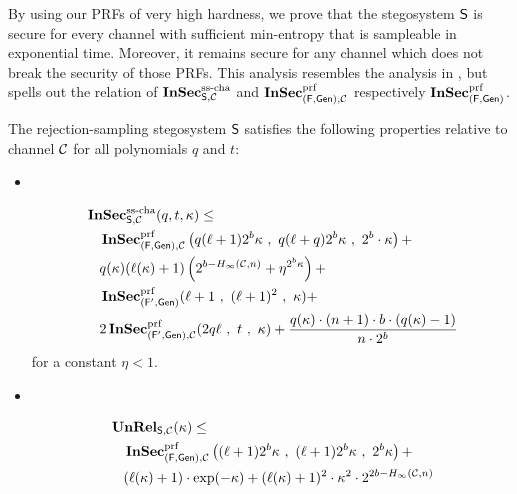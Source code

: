 By using our \acp{PRF} of very high hardness, we prove that the stegosystem  $\operatorname{\mathsf{S}}$
is secure for every channel with
sufficient min-entropy that is sampleable in exponential time. 
Moreover, it remains secure for any channel which does not break 
the security of those \acp{PRF}.
This analysis resembles the analysis in
\cite{backes2005active}, but spells out the relation of
$\operatorname{\mathbf{InSec}}^{\operatorname{ss-cha}}_{\operatorname{\mathsf{S}},\mathcal{C}}$ and
$\operatorname{\mathbf{InSec}}^{\operatorname{prf}}_{(\operatorname{\mathsf{F}},\operatorname{\mathsf{Gen}}),\mathcal{C}}$ respectively
$\operatorname{\mathbf{InSec}}^{\operatorname{prf}}_{(\operatorname{\mathsf{F}},\operatorname{\mathsf{Gen}})}$.



  \begin{theorem}
  \label{thm:stego_exists}
  The rejection-sampling stegosystem $\operatorname{\mathsf{S}}$ satisfies the following
  properties relative to channel $\mathcal{C}$ for all polynomials $q$ and $t$:
  \begin{itemize}
  \item \ 
    
    \vspace{-1.5cm}
    \begin{align*}
      &\InSec^{\sscha}_{\Steg,\chan}(q,t,\kappa) \leq\\
      &\quad \InSec^{\prf}_{(\algf,\Gen),\chan}\left(q(\ell+1)2^{b}\kappa\ ,\
        q(\ell+q)2^{b}\kappa\ ,\ 2^{b}\cdot \kappa\right)+\\
      &\quad q(\kappa)(\ell(\kappa)+1)\left(2^{b-\minent(\chan,n)}+\eta^{2^{b}\kappa}\right)+\\
      &\quad \InSec^{\prf}_{(\algf',\Gen)}(\ell+1\ ,\ (\ell+1)^{2}\ ,\ \kappa)  +\\
      &\quad 2\InSec^{\prf}_{(\algf',\Gen),\chan}(2q\ell\ ,\ t\ ,\ \kappa) +
      \frac{q(\kappa)\cdot (n+1)\cdot b\cdot 
        (q(\kappa)-1)}{n\cdot 2^{b}}
    \end{align*}
for a constant $\eta < 1$.
  \item  \ 

    \vspace{-1.5cm}
    \begin{align*}
      &\unrel_{\Steg,\chan}(\kappa) \leq\\
       &\quad
         \InSec^{\prf}_{(\algf,\Gen),\chan}\left((\ell+1)2^{b}\kappa\ ,\ (\ell+1)2^{b}
        \kappa\ ,\ 2^{b}\kappa\right)+\\
      &\quad  (\ell(\kappa)+1)\cdot \exp(-\kappa)+(\ell(\kappa)+1)^{2} \cdot
        \kappa^{2}\cdot  2^{2b-\minent(\chan,n)}
    \end{align*}

  \end{itemize}

  \end{theorem}

